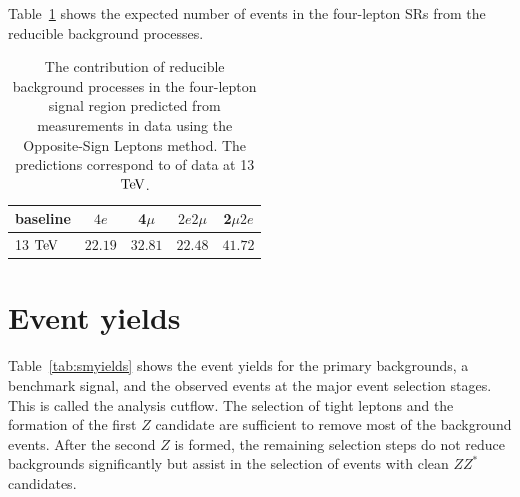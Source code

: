 Table~\ref{tab:reducibleMethodA} shows the expected number of
events in the four-lepton SRs from the reducible background processes. 

\begin{table}[h]
\begin{center}
     \begin{tabular}{ l | c | c | c | c } \hline
 baseline	& $4e$ 	 & 4$\mu$ & $2e2\mu$  & 2$\mu2e$   \\ \hline
 13 $\mathrm{Te\kern -0.1em V}$		& $22.19$ & $32.81$ & $22.48$    & $41.72$  \\  \hline
 	\end{tabular}
\end{center}
    \caption{ The contribution of reducible background
    processes in the four-lepton signal region predicted from measurements in data
    using the Opposite-Sign Leptons method. The predictions correspond to \usedLumi of data at 13 $\mathrm{Te\kern -0.1em V}$.}
     \label{tab:reducibleMethodA}
\end{table}


\section{Event yields}

Table~\ref{tab:smyields} shows the event yields for the primary backgrounds, a benchmark signal, and the observed events at the major event selection stages. This is called the analysis cutflow. The selection of tight leptons and the formation of the first $Z$ candidate are sufficient to remove most of the background events. After the second $Z$ is formed, the remaining selection steps do not reduce backgrounds significantly but assist in the selection of events with clean $ZZ^*$ candidates. 

